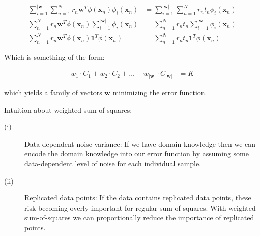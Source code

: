 \begin{align*}
  \sum_{i=1}^{|\textbf{w}|}
  \sum_{n=1}^{N} r_n \textbf{w}^T \phi(\textbf{x}_n)
  \phi_i(\textbf{x}_n) &= \sum_{i=1}^{|\textbf{w}|}
  \sum_{n=1}^{N} r_n t_n\phi_i(\textbf{x}_n) \\
  \sum_{n=1}^{N} r_n \textbf{w}^T \phi(\textbf{x}_n)
  \sum_{i=1}^{|\textbf{w}|}\phi_i(\textbf{x}_n) &=
  \sum_{n=1}^{N} r_n t_n
  \sum_{i=1}^{|\textbf{w}|}\phi_i(\textbf{x}_n)\\
  \sum_{n=1}^{N} r_n \textbf{w}^T \phi(\textbf{x}_n)
  \textbf{1}^T\phi(\textbf{x}_n) &=
  \sum_{n=1}^{N} r_n t_n
  \textbf{1}^T\phi(\textbf{x}_n)
\end{align*}

Which is something of the form:

\begin{align*}
  w_1\cdot C_1 + w_2\cdot C_2 + \ldots +
  w_{|\textbf{w}|}\cdot C_{|\textbf{w}|} &= K
\end{align*}

which yields a family of vectors $\textbf{w}$
minimizing the error function.

Intuition about weighted sum-of-squares:

\begin{description}
	\item[(i)] Data dependent noise variance: If we have domain knowledge
    then we can encode the domain knowledge into our error function
    by assuming some data-dependent level of noise for each individual
    sample.
    \item[(ii)] Replicated data points: If the data contains replicated
    data points, these risk becoming overly important for regular
    sum-of-squares. With weighted sum-of-squares we can proportionally
    reduce the importance of replicated points.
\end{description}